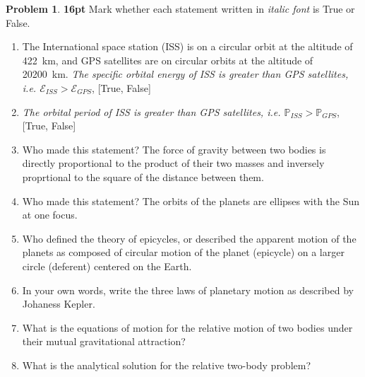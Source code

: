 \documentclass[10pt]{article}
\theoremstyle{definition}
\newtheorem{prob}{Problem}[section]
\renewcommand{\theprob}{\arabic{prob}}
\newenvironment{subprob}%
{\renewcommand{\theenumi}{\alph{enumi}}\renewcommand{\labelenumi}{(\theenumi)}\begin{enumerate}}%
{\end{enumerate}}%
\begin{document}
\clearpage\newpage
\begin{prob}
    \textbf{16pt} Mark whether each statement written in \textit{italic font} is True or False.
\begin{subprob}

    \item The International space station (ISS) is on a circular orbit at the altitude of \SI{422}{\kilo\meter}, and GPS satellites are on circular orbits at the altitude of \SI{20200}{\kilo\meter}. \textit{The specific orbital energy of ISS is greater than GPS satellites, i.e. $\mathcal{E}_{ISS} > \mathcal{E}_{GPS}$}, [True, False]

    \vspace*{1cm}

    \item \textit{The orbital period of ISS is greater than GPS satellites, i.e. $\mathbb{P}_{ISS} > \mathbb{P}_{GPS}$}, [True, False]


    \vspace*{1cm}

    \item Who made this statement? The force of gravity between two bodies is directly proportional to the product of their two masses and inversely proprtional to the square of the distance between them.

    \vspace*{1cm}

    \item Who made this statement? The orbits of the planets are ellipses with the Sun at one focus.

    \vspace*{1cm}

    \item Who defined the theory of epicycles, or described the apparent motion of the planets as composed of circular motion of the planet (epicycle) on a larger circle (deferent) centered on the Earth.

    \vspace*{1cm}
     
    \item In your own words, write the three laws of planetary motion as described by Johaness Kepler.

    \vspace*{1cm}

    \item What is the equations of motion for the relative motion of two bodies under their mutual gravitational attraction?

    \vspace*{1cm}

    \item What is the analytical solution for the relative two-body problem?

\end{subprob}
\end{prob}
\end{document}
